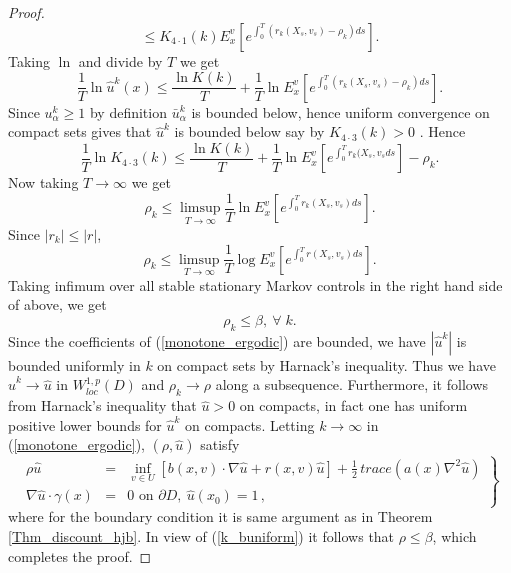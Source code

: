 \documentclass[11pt]{amsart}
\numberwithin{equation}{section}
\begin{document}
\begin{proof}
$$\leq K_{4 \cdot 1}(k) E^v_x\left[ e^{\int_{0}^{T} (r_k(X_s,v_s)-\rho_k) ds}\right] .
$$
Taking $\ln$ and divide by $T$ we get
$$
\frac{1}{T} \ln \hat u^k(x) \leq \frac{\ln K(k)}{T}+ \frac{1}{T}\ln E^v_x\left[ e^{\int_{0}^{T} (r_k(X_s,v_s)-\rho_k) ds}\right].
$$
Since $u^k_{\alpha}\geq 1$ by definition $\bar u^k_{\alpha}$ is bounded below, %
hence uniform convergence on compact sets gives that $\hat u^k$ is bounded below say by $K_{4 \cdot 3}(k)>0$ . 
Hence 
$$
\frac{1}{T} \ln K_{4 \cdot 3}(k) \leq \frac{\ln K(k)}{T}+ \frac{1}{T}\ln E^v_x\left[ e^{\int_{0}^{T} r_k(X_s,v_s ds} \right]  -\rho_k.
$$
Now taking $T \longrightarrow\infty$ we get
$$
\rho_k \leq \limsup_{T\longrightarrow\infty} \frac{1}{T}\ln E^v_x\left[ e^{\int_{0}^{T} r_k(X_s,v_s) ds}\right].
$$
Since $|r_k| \leq |r|$, 
$$
\rho_k \leq \limsup_{T\longrightarrow\infty} \frac{1}{T}\log E^v_x\left[ e^{\int_{0}^{T} r(X_s,v_s) ds}\right].
$$
Taking infimum over all stable stationary Markov controls in the right hand side of above, we get
\begin{equation}\label{k_buniform}
\rho_k \leq \beta, \  \forall\; k.
\end{equation}
Since the coefficients of (\ref{monotone_ergodic}) are bounded, we have $|\hat u^k| $ is bounded uniformly
in $k$ on compact sets by Harnack's inequality. Thus  we have 
$\hat u^k \longrightarrow \hat u$ in $W^{1,p}_{loc}(D)$ and $\rho_k\longrightarrow \rho$ along
a subsequence. Furthermore, it follows from Harnack's inequality that $\hat u >0$ on compacts, in fact one has uniform positive lower bounds for $\hat u^k$ on compacts. Letting $k\longrightarrow\infty$ in (\ref{monotone_ergodic}),  $(\rho,\hat u)$ satisfy 
\begin{equation}
\left.
\begin{array}{rcl}\label{monotone_ergodicfinal}
 \rho \hat u &=& \displaystyle{ \inf_{v \in U} \left[ b(x,v)\cdot  \nabla \hat u + 
 r(x,v)\hat u \right] +\frac{1}{2}\, trace (a(x)\nabla^2 \hat u) } \\
\displaystyle{ \nabla \hat u\cdot \gamma(x) } &=& 0 \mbox{ on } \partial D, \ 
 \hat u(x_0)=1 \, ,
\end{array}
\right\}
\end{equation} 
where for the boundary condition it is same argument as in Theorem \ref{Thm_discount_hjb}.
In view of (\ref{k_buniform}) it follows that $\rho \leq \beta$, which completes the proof. \end{proof}
\end{document}
